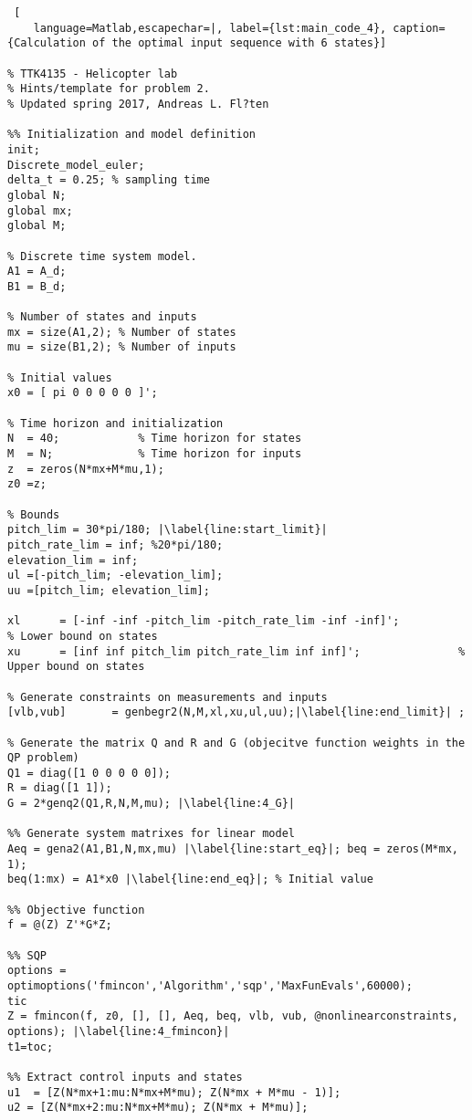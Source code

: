 \begin{lstlisting} [
    language=Matlab,escapechar=|, label={lst:main_code_4}, caption={Calculation of the optimal input sequence with 6 states}]

% TTK4135 - Helicopter lab
% Hints/template for problem 2.
% Updated spring 2017, Andreas L. Fl?ten

%% Initialization and model definition
init; 
Discrete_model_euler;
delta_t	= 0.25; % sampling time
global N;
global mx;
global M;

% Discrete time system model. 
A1 = A_d; 
B1 = B_d; 

% Number of states and inputs
mx = size(A1,2); % Number of states 
mu = size(B1,2); % Number of inputs

% Initial values
x0 = [ pi 0 0 0 0 0 ]';          

% Time horizon and initialization
N  = 40;            % Time horizon for states
M  = N;             % Time horizon for inputs
z  = zeros(N*mx+M*mu,1);                    
z0 =z; 

% Bounds
pitch_lim = 30*pi/180; |\label{line:start_limit}|
pitch_rate_lim = inf; %20*pi/180;
elevation_lim = inf;
ul =[-pitch_lim; -elevation_lim];
uu =[pitch_lim; elevation_lim];

xl      = [-inf -inf -pitch_lim -pitch_rate_lim -inf -inf]';              % Lower bound on states 
xu      = [inf inf pitch_lim pitch_rate_lim inf inf]';               % Upper bound on states 

% Generate constraints on measurements and inputs
[vlb,vub]       = genbegr2(N,M,xl,xu,ul,uu);|\label{line:end_limit}| ;

% Generate the matrix Q and R and G (objecitve function weights in the QP problem) 
Q1 = diag([1 0 0 0 0 0]);
R = diag([1 1]);
G = 2*genq2(Q1,R,N,M,mu); |\label{line:4_G}|

%% Generate system matrixes for linear model
Aeq = gena2(A1,B1,N,mx,mu) |\label{line:start_eq}|; beq = zeros(M*mx, 1);        
beq(1:mx) = A1*x0 |\label{line:end_eq}|; % Initial value

%% Objective function
f = @(Z) Z'*G*Z;

%% SQP
options = optimoptions('fmincon','Algorithm','sqp','MaxFunEvals',60000);
tic
Z = fmincon(f, z0, [], [], Aeq, beq, vlb, vub, @nonlinearconstraints, options); |\label{line:4_fmincon}|
t1=toc;

%% Extract control inputs and states
u1  = [Z(N*mx+1:mu:N*mx+M*mu); Z(N*mx + M*mu - 1)]; 
u2 = [Z(N*mx+2:mu:N*mx+M*mu); Z(N*mx + M*mu)];



\end{lstlisting}

